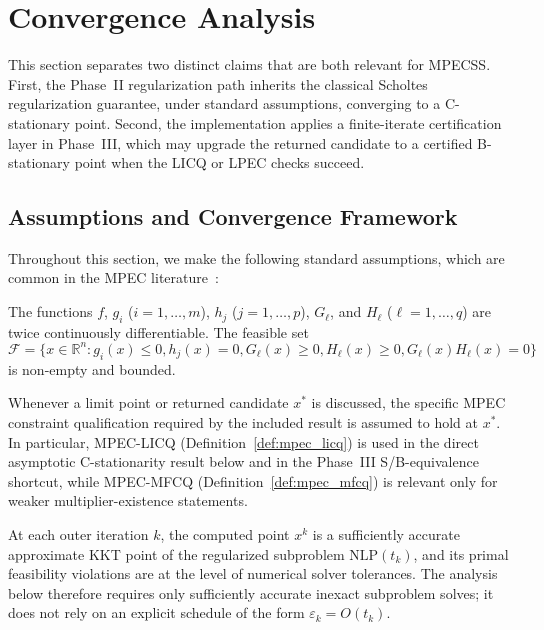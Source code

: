 \section{Convergence Analysis}
\label{sec:convergence}

This section separates two distinct claims that are both relevant for
MPECSS. First, the Phase~II regularization path inherits the classical
Scholtes regularization guarantee, under standard assumptions, converging to a C-stationary point. Second, the
implementation applies a finite-iterate certification layer in
Phase~III, which may upgrade the returned candidate to a certified
B-stationary point when the LICQ or LPEC checks succeed.

\subsection{Assumptions and Convergence Framework}
\label{sec:assumptions}

Throughout this section, we make the following standard assumptions, which are common in the MPEC literature~\cite{LuoPangRalph1996,ScheelScholtes2000,Scholtes2001}:

\begin{assumption}
\label{ass:smoothness}
The functions $f$, $g_i$ ($i=1,\ldots,m$), $h_j$ ($j=1,\ldots,p$), $G_\ell$, and $H_\ell$ ($\ell=1,\ldots,q$) are twice continuously differentiable. The feasible set
\[
  \mathcal{F} = \{x \in \mathbb{R}^n : g_i(x) \leq 0, h_j(x) = 0, G_\ell(x) \geq 0, H_\ell(x) \geq 0, G_\ell(x) H_\ell(x) = 0\}
\]
is non-empty and bounded.
\end{assumption}

\begin{assumption}
\label{ass:cq}
Whenever a limit point or returned candidate $x^*$ is discussed, the
specific MPEC constraint qualification required by the included result is
assumed to hold at $x^*$. In particular, MPEC-LICQ
(Definition~\ref{def:mpec_licq}) is used in the direct asymptotic
C-stationarity result below and in the Phase~III S/B-equivalence
shortcut, while MPEC-MFCQ (Definition~\ref{def:mpec_mfcq}) is relevant
only for weaker multiplier-existence statements.
\end{assumption}

\begin{assumption}
\label{ass:nlp_accuracy}
At each outer iteration $k$, the computed point $x^k$ is a sufficiently
accurate approximate KKT point of the regularized subproblem
$\text{NLP}(t_k)$, and its primal feasibility violations are at the
level of numerical solver tolerances. The analysis below therefore
requires only sufficiently accurate inexact subproblem solves; it does
not rely on an explicit schedule of the form $\varepsilon_k = O(t_k)$.
\end{assumption}

